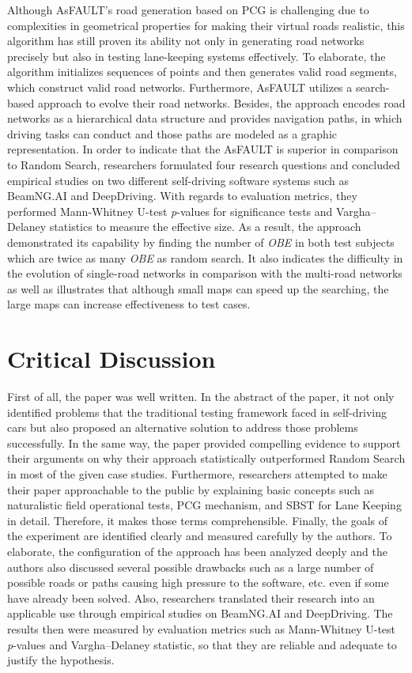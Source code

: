 \documentclass[10pt,a4paper]{report}
\begin{document}
Although AsFAULT’s road generation based on PCG is challenging due to complexities in geometrical properties for making their virtual roads realistic, 
this algorithm has still proven its ability not only in generating road networks precisely but also in testing lane-keeping systems effectively.
%
To elaborate, the algorithm initializes sequences of points and then generates valid road segments, which construct valid road networks.
%
Furthermore, AsFAULT utilizes a search-based approach to evolve their road networks.
%
Besides, the approach encodes road networks as a hierarchical data structure and provides navigation paths, in which driving tasks can conduct and those paths are modeled as a graphic representation.
%
In order to indicate that the AsFAULT is superior in comparison to Random Search, researchers formulated four research questions and concluded empirical studies on two different self-driving software systems such as BeamNG.AI and DeepDriving.
%
With regards to evaluation metrics, they performed Mann-Whitney U-test \textit{p}-values for significance tests and Vargha–Delaney statistics to measure the effective size.
%
As a result, the approach demonstrated its capability by finding the number of \textit{OBE} in both test subjects which are twice as many \textit{OBE} as random search. 
%
It also indicates the difficulty in the evolution of single-road networks in comparison with the multi-road networks as well as illustrates that although small maps can speed up the searching, the large maps can increase effectiveness to test cases.


\section{Critical Discussion}
First of all, the paper was well written. In the abstract of the paper, it not only identified problems that the traditional testing framework faced in self-driving cars but also proposed an alternative solution to address those problems successfully. In the same way, the paper provided compelling evidence to support their arguments on why their approach statistically outperformed Random Search in most of the given case studies. 
%
Furthermore, researchers attempted to make their paper approachable to the public by explaining basic concepts such as naturalistic field operational tests, PCG mechanism, and SBST for Lane Keeping in detail. Therefore, it makes those terms comprehensible. 
%
Finally, the goals of the experiment are identified clearly and measured carefully by the authors. To elaborate, the configuration of the approach has been analyzed deeply and the authors also discussed several possible drawbacks such as a large number of possible roads or paths causing high pressure to the software, etc. even if some have already been solved.
%
Also, researchers translated their research into an applicable use through empirical studies on BeamNG.AI and DeepDriving. The results then were measured by evaluation metrics such as Mann-Whitney U-test \textit{p}-values and Vargha–Delaney statistic, so that they are reliable and adequate to justify the hypothesis.
\end{document}
